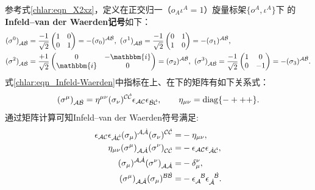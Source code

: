 参考式\eqref{chlar:eqn_X2xz}，定义在正交归一（$o_A \iota^A =1$）旋量标架$\{o^A,\iota^A\}$下
的{\heiti \bfseries Infeld--van der Waerden记号}如下：
\begin{equation}\label{chlar:eqn_Infeld-Waerden}
    \begin{aligned}
        &(\sigma^0)_{{\mathcal{A}} \dot{\mathcal{B}}} = \frac{-1}{\sqrt{2}} \begin{pmatrix} 1 & 0 \\ 0 & 1 \end{pmatrix}
        = - (\sigma_0)^{{\mathcal{A}} \dot{\mathcal{B}}}, \
        (\sigma^1)_{{\mathcal{A}} \dot{\mathcal{B}}} = \frac{-1}{\sqrt{2}} \begin{pmatrix} 0 & 1 \\ 1 & 0 \end{pmatrix}
        =-(\sigma_1)^{{\mathcal{A}} \dot{\mathcal{B}}}, \\
        &(\sigma^2)_{{\mathcal{A}} \dot{\mathcal{B}}} = \frac{+1}{\sqrt{2}} \begin{pmatrix} 0 & 
            -\mathbbm{i} \\ \mathbbm{i} & 0 \end{pmatrix} =(\sigma_2)^{{\mathcal{A}} \dot{\mathcal{B}}}, \
        (\sigma^3)_{{\mathcal{A}} \dot{\mathcal{B}}} = \frac{-1}{\sqrt{2}} \begin{pmatrix} 1 & 0 \\ 0 & -1 \end{pmatrix}
        =-(\sigma_3)^{{\mathcal{A}} \dot{\mathcal{B}}}. 
    \end{aligned}
\end{equation}  %
式\eqref{chlar:eqn_Infeld-Waerden}中指标在上、在下的矩阵有如下关系式：
\begin{equation}\label{chlar:eqn_sud}
    (\sigma^\mu)_{{\mathcal{A}} \dot{\mathcal{B}}} = \eta^{\mu \nu} (\sigma_\nu)^{{\mathcal{C}} \dot{\mathcal{C}}}
    \epsilon_{\mathcal{A}\mathcal{C}} \epsilon_{\dot{\mathcal{B}}\dot{\mathcal{C}}}, \qquad \eta_{\mu \nu}={\rm diag}\{-+++\}.
\end{equation}
通过矩阵计算可知Infeld--van der Waerden符号满足:
\begin{align}
    \epsilon_{\mathcal{A}\mathcal{C}} \epsilon_{\dot{\mathcal{A}}\dot{\mathcal{C}}}
    (\sigma_\mu)^{{\mathcal{A}} \dot{\mathcal{A}}} (\sigma_\nu)^{ {\mathcal{C}} \dot{\mathcal{C}}}
    =&- \eta_{\mu\nu} ,  \label{chlar:eqn_eemetric-1} \\
    \eta_{\mu\nu} (\sigma^\mu)_{{\mathcal{A}} \dot{\mathcal{A}}}(\sigma^\nu)_{{\mathcal{C}} \dot{\mathcal{C}}}=&
    -\epsilon_{\mathcal{A}\mathcal{C}} \epsilon_{\dot{\mathcal{A}}\dot{\mathcal{C}}}, \label{chlar:eqn_eemetric-2} \\
    (\sigma_\mu)^{{\mathcal{A}} \dot{\mathcal{A}}} (\sigma^\nu)_{{\mathcal{A}} \dot{\mathcal{A}}} =&  -\delta_\mu^\nu,
    \label{chlar:eqn_ssd} \\
    (\sigma^\mu)_{{\mathcal{A}} \dot{\mathcal{A}}}  (\sigma_\mu)^{{\mathcal{B}} \dot{\mathcal{B}}} = &-
    \epsilon_{\mathcal{A}}^{\hphantom{A}\mathcal{B}} \epsilon_{\dot{{\mathcal{A}}}}^{\hphantom{A} \dot{\mathcal{B}}}.
    \label{chlar:eqn_ssdd}
\end{align}


